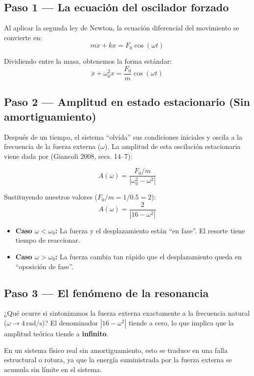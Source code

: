\documentclass[
  letterpaper,
  DIV=11,
  numbers=noendperiod]{scrreprt}
\providecommand{\tightlist}{%
  \setlength{\itemsep}{0pt}\setlength{\parskip}{0pt}}
\begin{document}
\subsection{Paso 1 --- La ecuación del oscilador
forzado}\label{paso-1-la-ecuaciuxf3n-del-oscilador-forzado}

Al aplicar la segunda ley de Newton, la ecuación diferencial del
movimiento se convierte en: \[m\ddot{x} + kx = F_0 \cos(\omega t)\]

Dividiendo entre la masa, obtenemos la forma estándar:
\[\ddot{x} + \omega_0^2 x = \frac{F_0}{m} \cos(\omega t)\]

\subsection{Paso 2 --- Amplitud en estado estacionario (Sin
amortiguamiento)}\label{paso-2-amplitud-en-estado-estacionario-sin-amortiguamiento}

Después de un tiempo, el sistema ``olvida'' sus condiciones iniciales y
oscila a la frecuencia de la fuerza externa (\(\omega\)). La amplitud de
esta oscilación estacionaria viene dada por (Giancoli 2008, secs.
14--7):

\[
A(\omega) = \frac{F_0/m}{\left|\omega_0^2 - \omega^2\right|}
\]

Sustituyendo nuestros valores (\(F_0/m = 1/0.5 = 2\)):
\[A(\omega) = \frac{2}{|16 - \omega^2|}\]

\begin{itemize}
\tightlist
\item
  \textbf{Caso \(\omega < \omega_0\):} La fuerza y el desplazamiento
  están ``en fase''. El resorte tiene tiempo de reaccionar.
\item
  \textbf{Caso \(\omega > \omega_0\):} La fuerza cambia tan rápido que
  el desplazamiento queda en ``oposición de fase''.
\end{itemize}

\subsection{Paso 3 --- El fenómeno de la
resonancia}\label{paso-3-el-fenuxf3meno-de-la-resonancia}

¿Qué ocurre si sintonizamos la fuerza externa exactamente a la
frecuencia natural (\(\omega \to 4\,\text{rad/s}\))? El denominador
\(|16 - \omega^2|\) tiende a cero, lo que implica que la amplitud
teórica tiende a \textbf{infinito}.

En un sistema físico real sin amortiguamiento, esto se traduce en una
falla estructural o rotura, ya que la energía suministrada por la fuerza
externa se acumula sin límite en el sistema.
\end{document}
